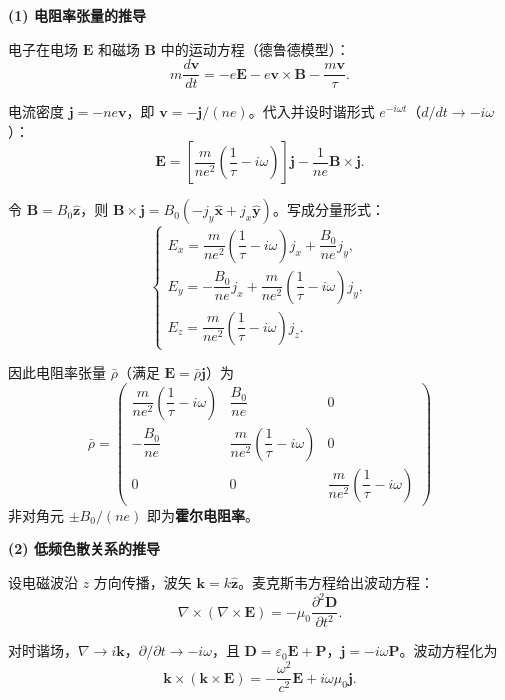 \begin{derivationbox}[标准解题过程]
\textbf{(1) 电阻率张量的推导}

电子在电场 $\bm{E}$ 和磁场 $\bm{B}$ 中的运动方程（德鲁德模型）：
\begin{equation}
m\frac{d\bm{v}}{dt}=-e\bm{E}-e\bm{v}\times\bm{B}-\frac{m\bm{v}}{\tau}.
\end{equation}

电流密度 $\bm{j}=-ne\bm{v}$，即 $\bm{v}=-\bm{j}/(ne)$。代入并设时谐形式 $e^{-i\omega t}$（$d/dt\to -i\omega$）：
\begin{equation}
\bm{E}=\left[\frac{m}{ne^2}\left(\frac{1}{\tau}-i\omega\right)\right]\bm{j}-\frac{1}{ne}\bm{B}\times\bm{j}.
\end{equation}

令 $\bm{B}=B_0\hat{\bm{z}}$，则 $\bm{B}\times\bm{j}=B_0(-j_y\hat{\bm{x}}+j_x\hat{\bm{y}})$。写成分量形式：
\begin{equation}
\begin{cases}
E_x=\dfrac{m}{ne^2}\left(\dfrac{1}{\tau}-i\omega\right)j_x+\dfrac{B_0}{ne}j_y,\\[8pt]
E_y=-\dfrac{B_0}{ne}j_x+\dfrac{m}{ne^2}\left(\dfrac{1}{\tau}-i\omega\right)j_y,\\[8pt]
E_z=\dfrac{m}{ne^2}\left(\dfrac{1}{\tau}-i\omega\right)j_z.
\end{cases}
\end{equation}

因此电阻率张量 $\bar{\rho}$（满足 $\bm{E}=\bar{\rho}\bm{j}$）为
\begin{equation}
\boxed{
\bar{\rho}=\begin{pmatrix}
\dfrac{m}{ne^2}\left(\dfrac{1}{\tau}-i\omega\right) & \dfrac{B_0}{ne} & 0\\[10pt]
-\dfrac{B_0}{ne} & \dfrac{m}{ne^2}\left(\dfrac{1}{\tau}-i\omega\right) & 0\\[10pt]
0 & 0 & \dfrac{m}{ne^2}\left(\dfrac{1}{\tau}-i\omega\right)
\end{pmatrix}
}
\end{equation}
非对角元 $\pm B_0/(ne)$ 即为\textbf{霍尔电阻率}。

\textbf{(2) 低频色散关系的推导}

设电磁波沿 $z$ 方向传播，波矢 $\bm{k}=k\hat{\bm{z}}$。麦克斯韦方程给出波动方程：
\begin{equation}
\nabla\times(\nabla\times\bm{E})=-\mu_0\frac{\partial^2\bm{D}}{\partial t^2}.
\end{equation}

对时谐场，$\nabla\to i\bm{k}$，$\partial/\partial t\to -i\omega$，且 $\bm{D}=\varepsilon_0\bm{E}+\bm{P}$，$\bm{j}=-i\omega\bm{P}$。波动方程化为
\begin{equation}
\bm{k}\times(\bm{k}\times\bm{E})=-\frac{\omega^2}{c^2}\bm{E}+i\omega\mu_0\bm{j}.
\end{equation}


\end{derivationbox}
